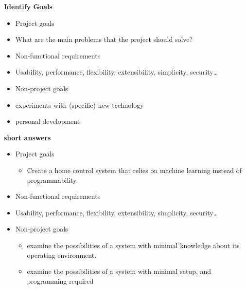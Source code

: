 \textbf{Identify Goals}

\begin{itemize}
\item Project goals

\item What are the main problems that the project should solve?

\item Non-functional requirements

\item Usability, performance, flexibility, extensibility, simplicity, security{\ldots}

\item Non-project goals

\item experiments with (specific) new technology

\item personal development

\end{itemize}

\textbf{short answers}

\begin{itemize}
\item Project goals

\begin{itemize}
\item Create a home control system that relies on machine learning instead of programmability.

\end{itemize}

\item Non-functional requirements

\item Usability, performance, flexibility, extensibility, simplicity, security{\ldots}

\item Non-project goals

\begin{itemize}
\item examine the possibilities of a system with minimal knowledge about its operating environment.

\item examine the possibilities of a system with minimal setup, and programming required

\end{itemize}

\end{itemize}

